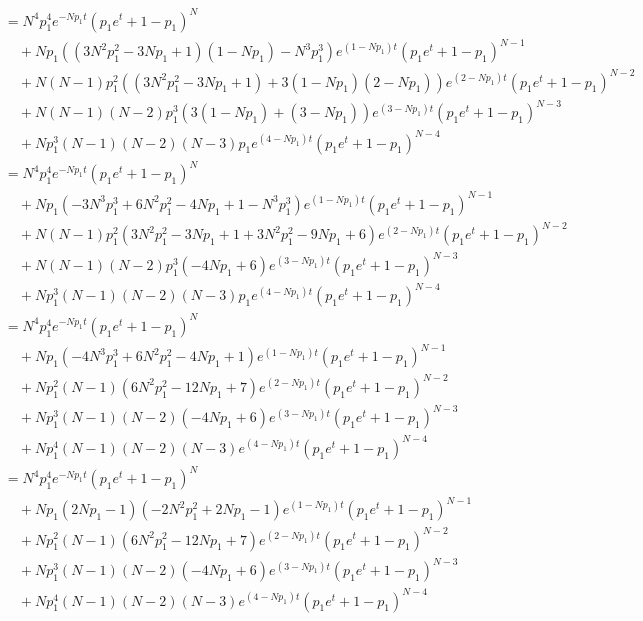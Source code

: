 \documentclass[dvipdfmx]{jsarticle}
\begin{document}
 \begin{align}
  &=N^4p_1^4e^{-Np_1t}\left(p_1e^t+1-p_1\right)^N\nonumber\\
  &\quad+Np_1\left(\left(3N^2p_1^2-3Np_1+1\right)\left(1-Np_1\right)-N^3p_1^3\right)e^{\left(1-Np_1\right)t}\left(p_1e^t+1-p_1\right)^{N-1}\nonumber\\
  &\quad+N\left(N-1\right)p_1^2\left(\left(3N^2p_1^2-3Np_1+1\right)+3\left(1-Np_1\right)\left(2-Np_1\right)\right)e^{\left(2-Np_1\right)t}\left(p_1e^t+1-p_1\right)^{N-2}\nonumber\\
  &\quad+N\left(N-1\right)\left(N-2\right)p_1^3\left(3\left(1-Np_1\right)+\left(3-Np_1\right)\right)e^{\left(3-Np_1\right)t}\left(p_1e^t+1-p_1\right)^{N-3}\nonumber\\
  &\quad+Np_1^3\left(N-1\right)\left(N-2\right)\left(N-3\right)p_1e^{\left(4-Np_1\right)t}\left(p_1e^t+1-p_1\right)^{N-4}\nonumber\\
  &=N^4p_1^4e^{-Np_1t}\left(p_1e^t+1-p_1\right)^N\nonumber\\
  &\quad+Np_1\left(-3N^3p_1^3+6N^2p_1^2-4Np_1+1-N^3p_1^3\right)e^{\left(1-Np_1\right)t}\left(p_1e^t+1-p_1\right)^{N-1}\nonumber\\
  &\quad+N\left(N-1\right)p_1^2\left(3N^2p_1^2-3Np_1+1+3N^2p_1^2-9Np_1+6\right)e^{\left(2-Np_1\right)t}\left(p_1e^t+1-p_1\right)^{N-2}\nonumber\\
  &\quad+N\left(N-1\right)\left(N-2\right)p_1^3\left(-4Np_1+6\right)e^{\left(3-Np_1\right)t}\left(p_1e^t+1-p_1\right)^{N-3}\nonumber\\
  &\quad+Np_1^3\left(N-1\right)\left(N-2\right)\left(N-3\right)p_1e^{\left(4-Np_1\right)t}\left(p_1e^t+1-p_1\right)^{N-4}\nonumber\\
  &=N^4p_1^4e^{-Np_1t}\left(p_1e^t+1-p_1\right)^N\nonumber\\
  &\quad+Np_1\left(-4N^3p_1^3+6N^2p_1^2-4Np_1+1\right)e^{\left(1-Np_1\right)t}\left(p_1e^t+1-p_1\right)^{N-1}\nonumber\\
  &\quad+Np_1^2\left(N-1\right)\left(6N^2p_1^2-12Np_1+7\right)e^{\left(2-Np_1\right)t}\left(p_1e^t+1-p_1\right)^{N-2}\nonumber\\
  &\quad+Np_1^3\left(N-1\right)\left(N-2\right)\left(-4Np_1+6\right)e^{\left(3-Np_1\right)t}\left(p_1e^t+1-p_1\right)^{N-3}\nonumber\\
  &\quad+Np_1^4\left(N-1\right)\left(N-2\right)\left(N-3\right)e^{\left(4-Np_1\right)t}\left(p_1e^t+1-p_1\right)^{N-4}\nonumber\\
  &=N^4p_1^4e^{-Np_1t}\left(p_1e^t+1-p_1\right)^N\nonumber\\
  &\quad+Np_1\left(2Np_1-1\right)\left(-2N^2p_1^2+2Np_1-1\right)e^{\left(1-Np_1\right)t}\left(p_1e^t+1-p_1\right)^{N-1}\nonumber\\
  &\quad+Np_1^2\left(N-1\right)\left(6N^2p_1^2-12Np_1+7\right)e^{\left(2-Np_1\right)t}\left(p_1e^t+1-p_1\right)^{N-2}\nonumber\\
  &\quad+Np_1^3\left(N-1\right)\left(N-2\right)\left(-4Np_1+6\right)e^{\left(3-Np_1\right)t}\left(p_1e^t+1-p_1\right)^{N-3}\nonumber\\
  &\quad+Np_1^4\left(N-1\right)\left(N-2\right)\left(N-3\right)e^{\left(4-Np_1\right)t}\left(p_1e^t+1-p_1\right)^{N-4}\nonumber\\
 \end{align}
\end{document}
